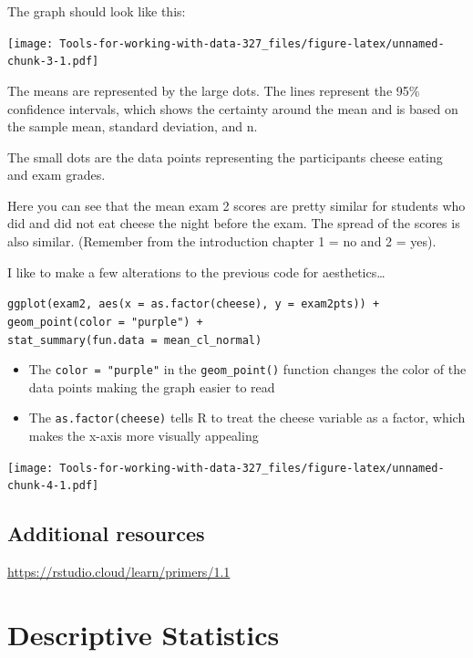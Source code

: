 \documentclass[
]{book}
\providecommand{\tightlist}{%
  \setlength{\itemsep}{0pt}\setlength{\parskip}{0pt}}
\begin{document}
The graph should look like this:

\texttt{[image: Tools-for-working-with-data-327\_files/figure-latex/unnamed-chunk-3-1.pdf]}

The means are represented by the large dots. The lines represent the 95\% confidence intervals, which shows the certainty around the mean and is based on the sample mean, standard deviation, and n.~

The small dots are the data points representing the participants cheese eating and exam grades.

Here you can see that the mean exam 2 scores are pretty similar for students who did and did not eat cheese the night before the exam. The spread of the scores is also similar. (Remember from the introduction chapter 1 = no and 2 = yes).

I like to make a few alterations to the previous code for aesthetics\ldots{}

\texttt{ggplot(exam2,\ aes(x\ =\ as.factor(cheese),\ y\ =\ exam2pts))\ +}\\
\texttt{geom\_point(color\ =\ "purple")\ +}~\\
\texttt{stat\_summary(fun.data\ =\ mean\_cl\_normal)}

\begin{itemize}
\tightlist
\item
  The \texttt{color\ =\ "purple"} in the \texttt{geom\_point()} function changes the color of the data points making the graph easier to read\\
\item
  The \texttt{as.factor(cheese)} tells R to treat the cheese variable as a factor, which makes the x-axis more visually appealing
\end{itemize}

\texttt{[image: Tools-for-working-with-data-327\_files/figure-latex/unnamed-chunk-4-1.pdf]}

\hypertarget{additional-resources}{%
\section{Additional resources}\label{additional-resources}}

\url{https://rstudio.cloud/learn/primers/1.1}

\hypertarget{descriptive-statistics}{%
\chapter{Descriptive Statistics}\label{descriptive-statistics}}
\end{document}
